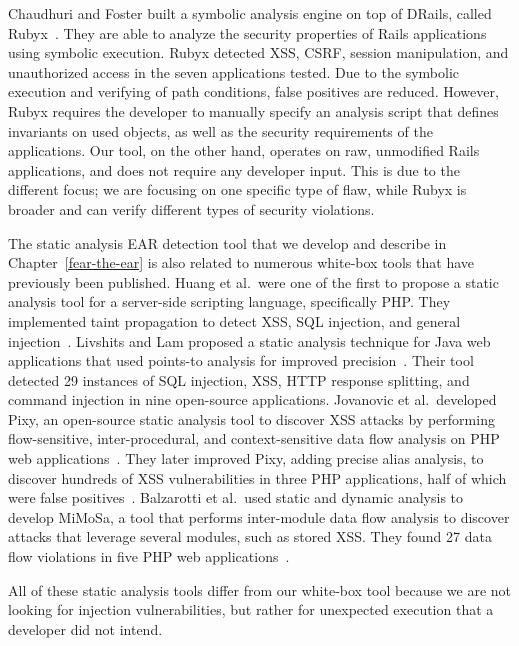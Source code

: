 Chaudhuri and Foster built a symbolic analysis engine on top of
DRails, called Rubyx~\cite{chaudhuri10:ssarorwa}. They are able to
analyze the security properties of Rails applications using symbolic
execution. Rubyx detected XSS, CSRF, session manipulation, and
unauthorized access in the seven applications tested. Due to the
symbolic execution and verifying of path conditions, false positives
are reduced. However, Rubyx requires the developer to manually specify
an analysis script that defines invariants on used objects, as well as
the security requirements of the applications. Our tool, on the other
hand, operates on raw, unmodified Rails applications, and does not
require any developer input. This is due to the different focus; we
are focusing on one specific type of flaw, while Rubyx is broader and
can verify different types of security violations.

The static analysis EAR detection tool that we develop and describe in
Chapter~\ref{fear-the-ear} is also related to numerous white-box tools
that have previously been published. Huang et al.\ were one of the
first to propose a static analysis tool for a server-side scripting
language, specifically PHP. They implemented taint propagation to
detect XSS, SQL injection, and general
injection~\cite{huang04:securing}. Livshits and Lam proposed a static
analysis technique for Java web applications that used points-to
analysis for improved precision~\cite{livshits05:java-static}. Their
tool detected 29 instances of SQL injection, XSS, HTTP response
splitting, and command injection in nine open-source applications.
Jovanovic et al.\ developed Pixy, an open-source static analysis tool
to discover XSS attacks by performing flow-sensitive,
inter-procedural, and context-sensitive data flow analysis on PHP web
applications~\cite{jovanovic06:pixy-improved}. They later improved
Pixy, adding precise alias analysis, to discover hundreds of XSS
vulnerabilities in three PHP applications, half of which were false
positives~\cite{jovanovic06:pixy-short}. Balzarotti et al.\ used
static and dynamic analysis to develop MiMoSa, a tool that performs
inter-module data flow analysis to discover attacks that leverage
several modules, such as stored XSS. They found 27 data flow
violations in five PHP web applications~\cite{balzarotti07:mimosa}.

All of these static analysis tools differ from our white-box tool
because we are not looking for injection vulnerabilities, but rather
for unexpected execution that a developer did not intend.

